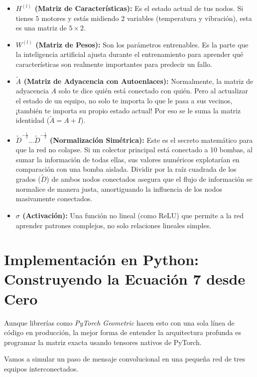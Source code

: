 \documentclass[12pt,a4paper]{article}
\begin{document}
\begin{itemize}
    \item \textbf{$H^{(l)}$ (Matriz de Características):} Es el estado actual de tus nodos. Si tienes $5$ motores y estás midiendo $2$ variables (temperatura y vibración), esta es una matriz de $5 \times 2$.
    \item \textbf{$W^{(l)}$ (Matriz de Pesos):} Son los parámetros entrenables. Es la parte que la inteligencia artificial ajusta durante el entrenamiento para aprender qué características son realmente importantes para predecir un fallo.
    \item \textbf{$\tilde{A}$ (Matriz de Adyacencia con Autoenlaces):} Normalmente, la matriz de adyacencia $A$ solo te dice quién está conectado con quién. Pero al actualizar el estado de un equipo, no solo te importa lo que le pasa a sus vecinos, ¡también te importa su propio estado actual! Por eso se le suma la matriz identidad ($\tilde{A} = A + I$).
    \item \textbf{$\tilde{D}^{-\frac{1}{2}} \dots \tilde{D}^{-\frac{1}{2}}$ (Normalización Simétrica):} Este es el secreto matemático para que la red no colapse. Si un colector principal está conectado a 10 bombas, al sumar la información de todas ellas, sus valores numéricos explotarían en comparación con una bomba aislada. Dividir por la raíz cuadrada de los grados ($\tilde{D}$) de ambos nodos conectados asegura que el flujo de información se normalice de manera justa, amortiguando la influencia de los nodos masivamente conectados.
    \item \textbf{$\sigma$ (Activación):} Una función no lineal (como ReLU) que permite a la red aprender patrones complejos, no solo relaciones lineales simples.
\end{itemize}

\section{Implementación en Python: Construyendo la Ecuación 7 desde Cero}

Aunque librerías como \textit{PyTorch Geometric} hacen esto con una sola línea de código en producción, la mejor forma de entender la arquitectura profunda es programar la matriz exacta usando tensores nativos de PyTorch.

Vamos a simular un paso de mensaje convolucional en una pequeña red de tres equipos interconectados.
\end{document}
